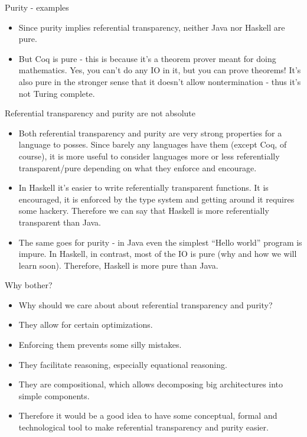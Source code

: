 \documentclass{beamer}
\begin{document}
\begin{frame}{Purity - examples}
\begin{itemize}
	\item Since purity implies referential transparency, neither Java nor Haskell are pure.
	\item But Coq is pure - this is because it's a theorem prover meant for doing mathematics. Yes, you can't do any IO in it, but you can prove theorems! It's also pure in the stronger sense that it doesn't allow nontermination - thus it's not Turing complete.
\end{itemize}
\end{frame}

\begin{frame}{Referential transparency and purity are not absolute}
\begin{itemize}
	\item Both referential transparency and purity are very strong properties for a language to posses. Since barely any languages have them (except Coq, of course), it is more useful to consider languages more or less referentially transparent/pure depending on what they enforce and encourage.
	\item In Haskell it's easier to write referentially transparent functions. It is encouraged, it is enforced by the type system and getting around it requires some hackery. Therefore we can say that Haskell is more referentially transparent than Java.
	\item The same goes for purity - in Java even the simplest ``Hello world'' program is impure. In Haskell, in contrast, most of the IO is pure (why and how we will learn soon). Therefore, Haskell is more pure than Java.
\end{itemize}
\end{frame}

\begin{frame}{Why bother?}
\begin{itemize}
	\item Why should we care about about referential transparency and purity?
	\item They allow for certain optimizations.
	\item Enforcing them prevents some silly mistakes.
	\item They facilitate reasoning, especially equational reasoning.
	\item They are compositional, which allows decomposing big architectures into simple components.
	\item Therefore it would be a good idea to have some conceptual, formal and technological tool to make referential transparency and purity easier.
\end{itemize}
\end{frame}
\end{document}
